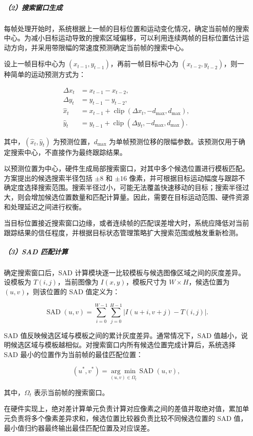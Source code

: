 \documentclass[UTF8,a4paper,12pt,fontset=windows]{ctexart}
\begin{document}
\subparagraph*{（2）搜索窗口生成}
每帧处理开始时，系统根据上一帧的目标位置和运动变化情况，确定当前帧的搜索中心。为减小目标运动导致的搜索区域偏移，可以利用连续两帧的目标位置估计运动方向，并采用带限幅的常速度预测确定当前帧的搜索中心。

设上一帧目标中心为 \((x_{t-1},y_{t-1})\)，再前一帧目标中心为 \((x_{t-2},y_{t-2})\)，则一种简单的运动预测方式为：

\[
\begin{aligned}
\Delta x_t &= x_{t-1}-x_{t-2},\\
\Delta y_t &= y_{t-1}-y_{t-2},\\
\hat{x}_t &= x_{t-1}
+\operatorname{clip}(\Delta x_t,-d_{\max},d_{\max}),\\
\hat{y}_t &= y_{t-1}
+\operatorname{clip}(\Delta y_t,-d_{\max},d_{\max}).
\end{aligned}
\]

其中，\((\hat{x}_t,\hat{y}_t)\) 为预测位置，\(d_{\max}\) 为单帧预测位移的限幅参数。该预测仅用于确定搜索中心，不直接作为最终跟踪结果。

以预测位置为中心，硬件生成局部搜索窗口，对其中多个候选位置进行模板匹配。方案提出的候选搜索半径包括 \(\pm8\) 和 \(\pm16\) 像素，并可根据目标运动幅度与跟踪不确定度选择搜索范围。搜索半径过小，可能无法覆盖快速移动的目标；搜索半径过大，则会增加候选位置数量和匹配计算量。因此，需要在目标运动范围、硬件资源和处理延迟之间进行权衡。

当目标位置接近搜索窗口边缘，或者连续帧的匹配误差增大时，系统应降低对当前跟踪结果的信任程度，并根据目标状态管理策略扩大搜索范围或触发重新检测。

\subparagraph*{（3）SAD 匹配计算}
确定搜索窗口后，SAD 计算模块逐一比较模板与候选图像区域之间的灰度差异。设模板为 \(T(i,j)\)，当前图像为 \(I(x,y)\)，模板尺寸为 \(W\times H\)，候选位置为 \((u,v)\)，则该位置的 SAD 值定义为：

\[
\operatorname{SAD}(u,v)=
\sum_{i=0}^{W-1}
\sum_{j=0}^{H-1}
\left|I(u+i,v+j)-T(i,j)\right|.
\]

SAD 值反映候选区域与模板之间的累计灰度差异。通常情况下，SAD 值越小，说明候选区域与模板越相似。对搜索窗口内所有候选位置完成计算后，系统选择 SAD 最小的位置作为当前帧的最佳匹配位置：

\[
(u^*,v^*)=
\underset{(u,v)\in\Omega_t}{\arg\min}
\operatorname{SAD}(u,v),
\]

其中，\(\Omega_t\) 表示当前帧的搜索窗口。

在硬件实现上，绝对差计算单元负责计算对应像素之间的差值并取绝对值，累加单元负责将多个像素差异求和，候选位置比较器负责比较不同候选位置的 SAD 值，最小值归约器最终输出最佳匹配位置及对应误差。
\end{document}
